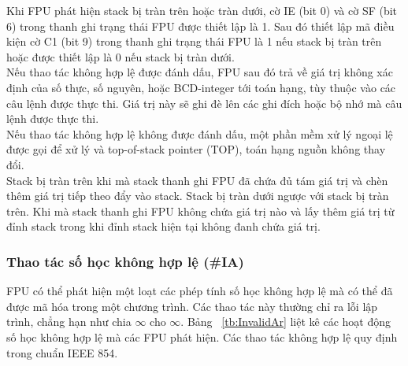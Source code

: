 		Khi FPU phát hiện stack bị tràn trên hoặc tràn dưới, cờ IE (bit 0) và cờ SF (bit 6) trong thanh ghi trạng thái FPU được thiết lập là 1. Sau đó thiết lập mã điều kiện cờ C1 (bit 9) trong thanh ghi trạng thái  FPU là 1 nếu stack bị tràn trên hoặc được thiết lập là 0 nếu stack bị tràn dưới.\\
		
		Nếu thao tác không hợp lệ được đánh dấu, FPU sau đó trả về giá trị không xác định của số thực, số nguyên, hoặc BCD-integer tới toán hạng, tùy thuộc vào các câu lệnh được thực thi. Giá trị này sẽ ghi đè lên các ghi đích hoặc bộ nhớ mà câu lệnh được thực thi.\\
		
		Nếu thao tác không hợp lệ không được đánh dấu, một phần mềm xử lý ngoại lệ được gọi để xử lý và top-of-stack pointer (TOP), toán hạng nguồn không thay đổi.\\
		
		Stack bị tràn trên khi mà stack thanh ghi FPU đã chứa đủ tám giá trị và chèn thêm giá trị tiếp theo đẩy vào stack. Stack bị tràn dưới ngược với stack bị tràn trên. Khi mà stack thanh ghi FPU không chứa giá trị nào và lấy thêm giá trị từ đỉnh stack trong khi đỉnh stack hiện tại không đanh chứa giá trị.
		
		\subsubsection*{Thao tác số học không hợp lệ (\#IA)}
		FPU có thể phát hiện một loạt các phép tính số học không hợp lệ mà có thể đã được mã hóa trong một chương trình. Các thao tác này thường chỉ ra lỗi lập trình, chẳng hạn như chia $\mathbb{\infty}$ cho $\mathbb{\infty}$. Bảng ~\ref{tb:InvalidAr}  liệt kê các hoạt động số học không hợp lệ mà các FPU phát hiện. Các thao tác không hợp lệ quy định trong chuẩn IEEE 854.\\
		
